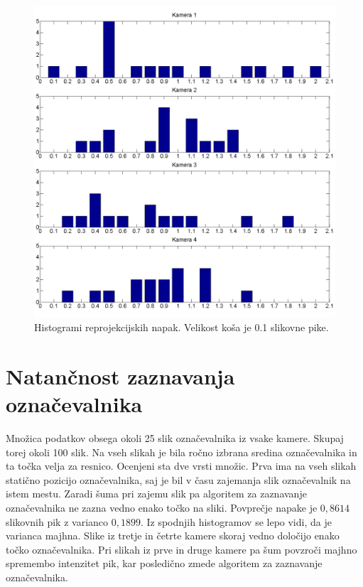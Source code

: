 \documentclass[a4paper, 12pt]{book}
\begin{document}
\begin{figure}[H]
\centering
\includegraphics[width=\textwidth,height=\textheight,keepaspectratio]{reprojected_bar.png}
\caption{Histogrami reprojekcijskih napak. Velikost koša je 0.1 slikovne pike.}
\end{figure}

\section{Natančnost zaznavanja označevalnika}
Množica podatkov obsega okoli 25 slik označevalnika iz vsake kamere. Skupaj torej okoli 100 slik. Na vseh slikah je bila ročno izbrana sredina označevalnika in ta točka velja za resnico. Ocenjeni sta dve vrsti množic. Prva ima na vseh slikah statično pozicijo označevalnika, saj je bil v času zajemanja slik označevalnik na istem mestu. Zaradi šuma pri zajemu slik pa algoritem za zaznavanje označevalnika ne zazna vedno enako točko na sliki. Povprečje napake je $0,8614$ slikovnih pik z varianco $0,1899$. Iz spodnjih histogramov se lepo vidi, da je varianca majhna. Slike iz tretje in četrte kamere skoraj vedno določijo enako točko označevalnika. Pri slikah iz prve in druge kamere pa šum povzroči majhno spremembo intenzitet pik, kar posledično zmede algoritem za zaznavanje označevalnika.
\end{document}
